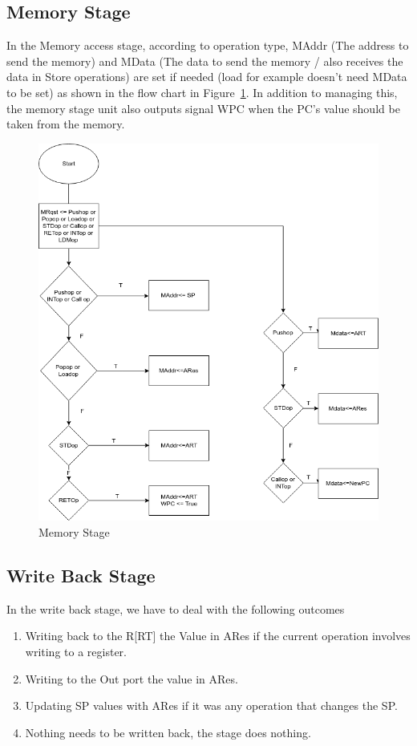 \documentclass[12pt]{article}
\theoremstyle{plain}
\theoremstyle{definition}
\begin{document}
\subsection{Memory Stage}
In the Memory access stage, according to operation type, MAddr (The address to send the memory) and MData (The data to send the memory / also receives the data in Store operations) are set if needed (load for example doesn't need MData to be set) as shown in the flow chart in Figure~\ref{memory-chart}. In addition to managing this, the memory stage unit also outputs signal WPC when the PC's value should be taken from the memory.
\begin{figure}
    \centering
    \includegraphics[width=\textwidth,height=\textheight,keepaspectratio]{Diagrams/MemoryStage.png}
    \caption{Memory Stage}
    \label{memory-chart}
\end{figure}

\subsection{Write Back Stage}
In the write back stage, we have to deal with the following outcomes
 \begin{enumerate}
\item Writing back to the R[RT] the Value in ARes if the current operation involves writing to a register.
\item Writing to the Out port the value in ARes.
\item Updating SP values with ARes if it was any operation that changes the SP.
\item Nothing needs to be written back, the stage does nothing.
\end{enumerate}
\end{document}
